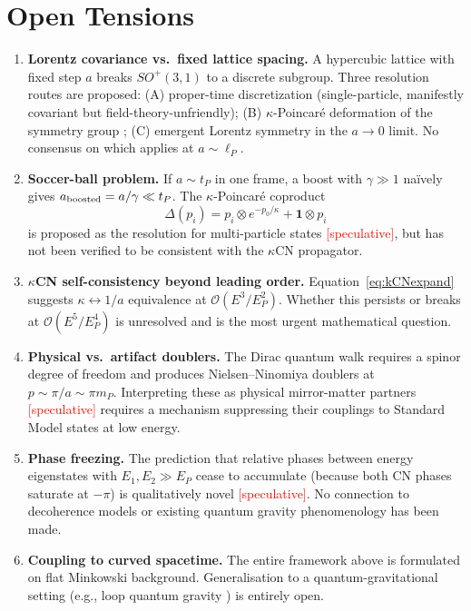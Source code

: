 \documentclass[11pt,a4paper]{article}
\begin{document}
\section{Open Tensions}
\label{sec:tensions}

\begin{enumerate}
  \item \textbf{Lorentz covariance vs.\ fixed lattice spacing.} A hypercubic lattice with fixed step $a$ breaks $SO^+(3,1)$ to a discrete subgroup. Three resolution routes are proposed: (A) proper-time discretization (single-particle, manifestly covariant but field-theory-unfriendly); (B) $\kappa$-Poincar\'{e} deformation of the symmetry group \cite{ashtekar2004}; (C) emergent Lorentz symmetry in the $a\to 0$ limit. No consensus on which applies at $a\sim\ell_P$.

  \item \textbf{Soccer-ball problem.} If $a\sim t_P$ in one frame, a boost with $\gamma\gg 1$ na\"ively gives $a_{\rm boosted}=a/\gamma\ll t_P$. The $\kappa$-Poincar\'{e} coproduct
  \begin{equation}
    \Delta(p_i) = p_i\otimes e^{-p_0/\kappa} + \mathbf{1}\otimes p_i
    \label{eq:coproduct}
  \end{equation}
  is proposed as the resolution for multi-particle states \textcolor{red}{[speculative]}, but has not been verified to be consistent with the $\kappa$CN propagator.

  \item \textbf{$\kappa$CN self-consistency beyond leading order.} Equation~\eqref{eq:kCNexpand} suggests $\kappa\leftrightarrow 1/a$ equivalence at $\mathcal{O}(E^3/E_P^2)$. Whether this persists or breaks at $\mathcal{O}(E^5/E_P^4)$ is unresolved and is the most urgent mathematical question.

  \item \textbf{Physical vs.\ artifact doublers.} The Dirac quantum walk requires a spinor degree of freedom and produces Nielsen--Ninomiya doublers at $p\sim\pi/a\sim\pi m_P$. Interpreting these as physical mirror-matter partners \textcolor{red}{[speculative]} requires a mechanism suppressing their couplings to Standard Model states at low energy.

  \item \textbf{Phase freezing.} The prediction that relative phases between energy eigenstates with $E_1,E_2\gg E_P$ cease to accumulate (because both CN phases saturate at $-\pi$) is qualitatively novel \textcolor{red}{[speculative]}. No connection to decoherence models or existing quantum gravity phenomenology \cite{henson2006} has been made.

  \item \textbf{Coupling to curved spacetime.} The entire framework above is formulated on flat Minkowski background. Generalisation to a quantum-gravitational setting (e.g., loop quantum gravity \cite{thiemann1996,ashtekar2004}) is entirely open.
\end{enumerate}
\end{document}
